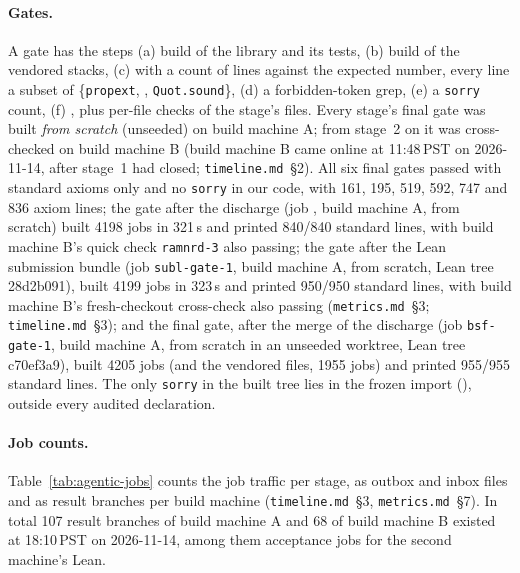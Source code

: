\begin{sloppypar}
\paragraph{Gates.} A gate has the steps (a) build of the library and its tests, (b) build of the vendored stacks,
(c)  with a count of lines against the expected number, every line a subset of
\{\texttt{propext}, , \texttt{Quot.sound}\}, (d) a forbidden-token grep, (e) a
\texttt{sorry} count, (f) , plus per-file checks of the stage's files. Every stage's final gate
was built \emph{from scratch} (unseeded) on build machine A; from stage~2 on it was cross-checked on build machine B
(build machine B came online at 11:48\,PST on 2026-11-14, after stage~1 had closed; \texttt{timeline.md}~\S2). All six
final gates passed with standard axioms only and no \texttt{sorry} in our code, with 161, 195, 519, 592, 747 and 836
axiom lines; the gate after the  discharge (job , build
machine A, from scratch) built 4198 jobs in 321\,s and printed 840/840 standard lines, with build machine B's quick check
\texttt{ramnrd-3} also passing; the gate after the Lean submission bundle (job \texttt{subl-gate-1}, build machine A, from
scratch, Lean tree 28d2b091), built 4199 jobs in 323\,s and printed 950/950 standard lines, with build machine B's fresh-checkout
cross-check  also passing (\texttt{metrics.md}~\S3; \texttt{timeline.md}~\S3); and the final gate, after the merge of
the  discharge (job \texttt{bsf-gate-1}, build machine A, from scratch in an unseeded worktree, Lean tree
c70ef3a9), built 4205 jobs (and the vendored files, 1955 jobs) and printed 955/955 standard lines. The only \texttt{sorry} in the built
tree lies in the frozen import (), outside every audited declaration.

\paragraph{Job counts.} Table~\ref{tab:agentic-jobs} counts the job traffic per stage, as outbox and inbox files and as
result branches per build machine (\texttt{timeline.md}~\S3, \texttt{metrics.md}~\S7). In total 107 result branches of
build machine A and 68 of build machine B existed at 18:10\,PST on 2026-11-14, among them acceptance jobs for the second
machine's Lean.
\end{sloppypar}

